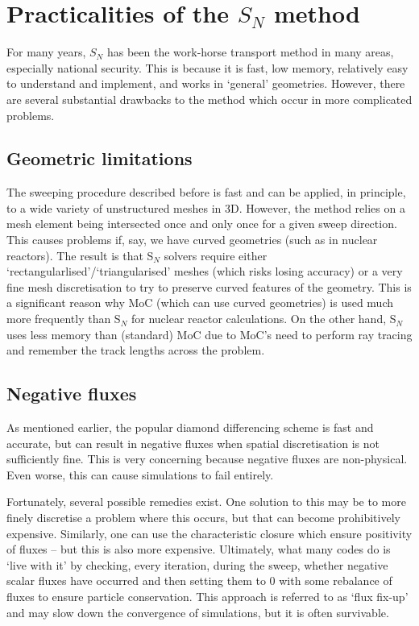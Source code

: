 \documentclass{article}
\begin{document}
\section{Practicalities of the $S_N$ method}

For many years, $S_N$ has been the work-horse transport method in many areas, especially national security. This is because it is fast, low memory, relatively easy to understand and implement, and works in `general' geometries. However, there are several substantial drawbacks to the method which occur in more complicated problems.

\subsection{Geometric limitations}

The sweeping procedure described before is fast and can be applied, in principle, to a wide variety of unstructured meshes in 3D. However, the method relies on a mesh element being intersected once and only once for a given sweep direction. This causes problems if, say, we have curved geometries (such as in nuclear reactors). The result is that S$_N$ solvers require either `rectangularlised'/`triangularised' meshes (which risks losing accuracy) or a very fine mesh discretisation to try to preserve curved features of the geometry. This is a significant reason why MoC (which can use curved geometries) is used much more frequently than S$_N$ for nuclear reactor calculations. On the other hand, S$_N$ uses less memory than (standard) MoC due to MoC's need to perform ray tracing and remember the track lengths across the problem.

\subsection{Negative fluxes}

As mentioned earlier, the popular diamond differencing scheme is fast and accurate, but can result in negative fluxes when spatial discretisation is not sufficiently fine. This is very concerning because negative fluxes are non-physical. Even worse, this can cause simulations to fail entirely. 

Fortunately, several possible remedies exist. One solution to this may be to more finely discretise a problem where this occurs, but that can become prohibitively expensive. Similarly, one can use the characteristic closure which ensure positivity of fluxes -- but this is also more expensive. Ultimately, what many codes do is `live with it' by checking, every iteration, during the sweep, whether negative scalar fluxes have occurred and then setting them to 0 with some rebalance of fluxes to ensure particle conservation. This approach is referred to as `flux fix-up' and may slow down the convergence of simulations, but it is often survivable.
\end{document}

